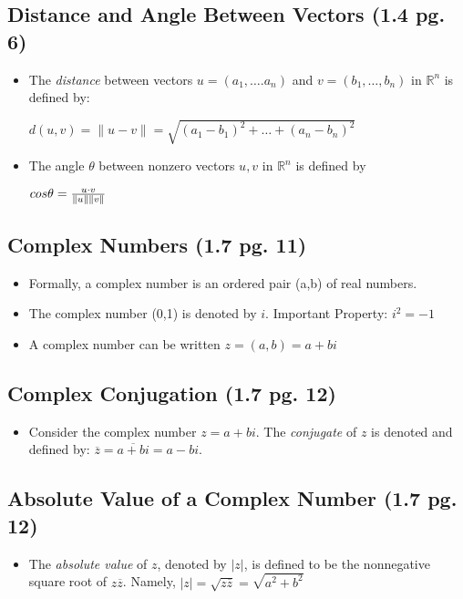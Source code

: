 \documentclass[hidelinks, 11pt, openleft]{scrartcl}
\begin{document}
\subsection*{Distance and Angle Between Vectors (1.4 pg. 6)}
\begin{itemize}
    \item The \textit{distance} between vectors $u=(a_{1}, \dots. a_{n})$ and $v=(b_{1}, \dots , b_{n})$ in $\mathbb{R}^n$ is defined by:
        \begin{center}
            $d(u,v) = \|u-v\| = \sqrt{(a_1-b_1)^2 + \dots + (a_n-b_n)^2}$ 
        \end{center}
    \item The angle $\theta$ between nonzero vectors $u,v$ in $\mathbb{R}^n$ is defined by
        \begin{center}
            ${cos\theta} = {u \cdot v \over \|u\|\|v\| }$
        \end{center}
\end{itemize}

\subsection*{Complex Numbers (1.7 pg. 11)}
\begin{itemize}
    \item Formally, a complex number is an ordered pair (a,b) of real numbers.
    \item The complex number (0,1) is denoted by $i$. Important Property: $i^2 = -1$
    \item A complex number can be written $z=(a,b)= a + bi$
\end{itemize}

\subsection*{Complex Conjugation (1.7 pg. 12)}
\begin{itemize}
    \item Consider the complex number $z=a+bi$. The \textit{conjugate} of $z$ is denoted and defined by: $\overline{z} = \overline{a+bi} = a-bi$.
\end{itemize}

\subsection*{Absolute Value of a Complex Number (1.7 pg. 12)}
\begin{itemize}
    \item The \textit{absolute value} of $z$, denoted by $|z|$, is defined to be the nonnegative square root of $z\overline{z}$. Namely, $|z|= \sqrt{z\overline{z}}= \sqrt{a^2+b^2}$
\end{itemize}
\end{document}
